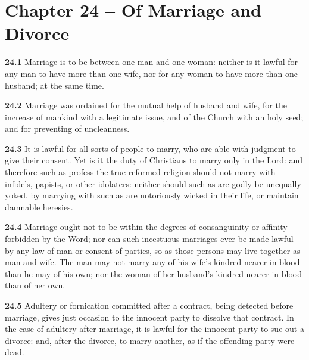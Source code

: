 \section{Chapter 24 -- Of Marriage and Divorce}

\par\textbf{24.1} Marriage is to be between one man and one woman: neither is it lawful for any man to have more than one wife, nor for any woman to have more than one husband; at the same time.   

\par\textbf{24.2} Marriage was ordained for the mutual help of husband and wife, for the increase of mankind with a legitimate issue, and of the Church with an holy seed; and for preventing of uncleanness.   

\par\textbf{24.3} It is lawful for all sorts of people to marry, who are able with judgment to give their consent. Yet is it the duty of Christians to marry only in the Lord: and therefore such as profess the true reformed religion should not marry with infidels, papists, or other idolaters: neither should such as are godly be unequally yoked, by marrying with such as are notoriously wicked in their life, or maintain damnable heresies.    

\par\textbf{24.4} Marriage ought not to be within the degrees of consanguinity or affinity forbidden by the Word; nor can such incestuous marriages ever be made lawful by any law of man or consent of parties, so as those persons may live together as man and wife. The man may not marry any of his wife's kindred nearer in blood than he may of his own; nor the woman of her husband's kindred nearer in blood than of her own.   

\par\textbf{24.5} Adultery or fornication committed after a contract, being detected before marriage, gives just occasion to the innocent party to dissolve that contract. In the case of adultery after marriage, it is lawful for the innocent party to sue out a divorce: and, after the divorce, to marry another, as if the offending party were dead.   

